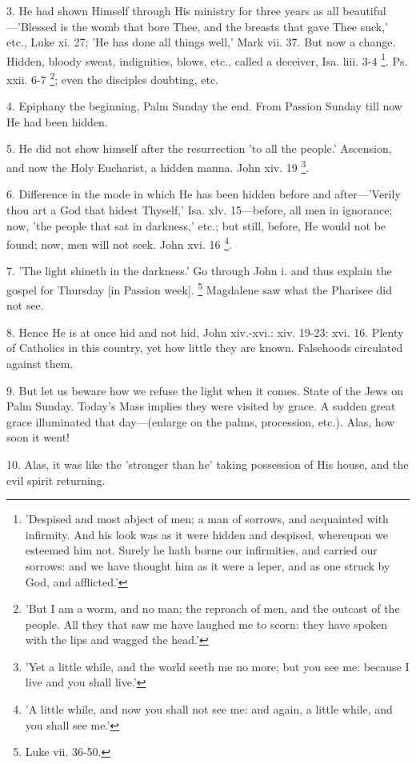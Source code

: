 3. He had shown Himself through His ministry for
three years as all beautiful—'Blessed is the womb that bore Thee,
and the breasts that gave Thee suck,' etc., Luke xi. 27; 'He has done
all things well,' Mark vii. 37. But now a change. Hidden, bloody
sweat, indignities, blows, etc., called a deceiver, Isa. liii. 3-4 \footnote{'Despised and most
abject of men; a man of sorrows, and acquainted with infirmity. And
his look was as it were hidden and despised, whereupon we esteemed him
not. Surely he hath borne our infirmities, and carried our sorrows:
and we have thought him as it were a leper, and as one struck by God,
and afflicted.'}. Ps. xxii. 6-7 \footnote{'But I am a worm, and no
man; the reproach of men, and the outcast of the people. All they that
saw me have laughed me to scorn: they have spoken with the lips and
wagged the head.'};
even the disciples doubting, etc.

4. Epiphany the beginning, Palm Sunday the end.
From Passion Sunday till now He had been hidden.

5. He did not show himself after the resurrection
'to all the people.' Ascension, and now the Holy Eucharist, a hidden
manna. John xiv. 19 \footnote{'Yet a little while, and
the world seeth me no more; but you see me: because I live and you
shall live.'}.

6. Difference in the mode in which He has been
hidden before and after—'Verily thou art a God that hidest Thyself,'
Isa. xlv. 15—before, all men in ignorance; now, 'the people that sat
in darkness,' etc.; but still, before, He would not be found; now, men
will not seek. John xvi. 16 \footnote{'A little while, and now
you shall not see me: and again, a little while, and you shall see
me.'}.

7. 'The light shineth in the darkness.' Go
through John i. and thus explain the gospel for Thursday [in Passion
week]. \footnote{Luke vii. 36-50.} Magdalene saw
what the Pharisee did not see.

8. Hence He is at once hid and not hid, John
xiv.-xvi.: xiv. 19-23: xvi. 16. Plenty of Catholics in this country,
yet how little they are known. Falsehoods circulated against them.

9. But let us beware how we refuse the light when
it comes. State of the Jews on Palm Sunday. Today's Mass implies they
were visited by grace. A sudden great grace illuminated that
day—(enlarge on the palms, procession, etc.). Alas, how soon it
went!

10. Alas, it was like the 'stronger than he'
taking possession of His house, and the evil spirit returning.

